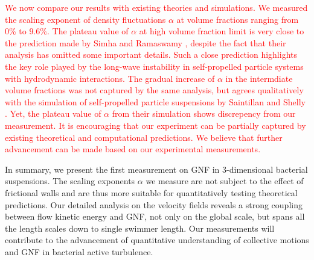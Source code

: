 \documentclass[twocolumn,aps,prl,amsmath,amssymb,longbibliography]{revtex4-2}
\begin{document}
\textcolor{red}{We now compare our results with existing theories and simulations. We measured the scaling exponent of density fluctuations $\alpha$ at volume fractions ranging from 0\% to 9.6\%. The plateau value of $\alpha$ at high volume fraction limit is very close to the prediction made by Simha and Ramaswamy \cite{AditiSimha2002}, despite the fact that their analysis has omitted some important details. Such a close prediction highlights the key role played by the long-wave instability in self-propelled particle systems with hydrodynamic interactions. The gradual increase of $\alpha$ in the intermdiate volume fractions was not captured by the same analysis, but agrees qualitatively with the simulation of self-propelled particle suspensions by Saintillan and Shelly \cite{Saintillan2012}. Yet, the plateau value of $\alpha$ from their simulation shows discrepency from our measurement. It is encouraging that our experiment can be partially captured by existing theoretical and computational predictions. We believe that further advancement can be made based on our experimental measurements.}

In summary, we present the first measurement on GNF in 3-dimensional bacterial suspensions. The scaling exponents $\alpha$ we measure are not subject to the effect of frictional walls and are thus more suitable for quantitatively testing theoretical predictions.
Our detailed analysis on the velocity fields reveals a strong coupling between flow kinetic energy and GNF, not only on the global scale, but spans all the length scales down to single swimmer length.
Our measurements will contribute to the advancement of quantitative understanding of collective motions and GNF in bacterial active turbulence.



\end{document}
